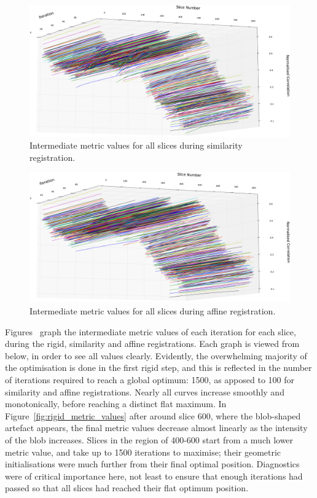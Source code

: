   \begin{figure}
    \centering
    \includegraphics[width=\textheight]{Ch6/Figs/diagnostics/similarity_metric_values}
    \caption{Intermediate metric values for all slices during similarity registration.}
    \label{fig:similarity_metric_values}
  \end{figure}
      
  \begin{figure}
    \centering
    \includegraphics[width=\textheight]{Ch6/Figs/diagnostics/affine_metric_values}
    \caption{Intermediate metric values for all slices during affine registration.}
    \label{fig:affine_metric_values}
  \end{figure}
  
	Figures~ graph the intermediate metric values of each iteration for each slice, during the rigid, similarity and affine registrations. Each graph is viewed from below, in order to see all values clearly. Evidently, the overwhelming majority of the optimisation is done in the first rigid step, and this is reflected in the number of iterations required to reach a global optimum: 1500, as apposed to 100 for similarity and affine registrations. Nearly all curves increase smoothly and monotonically, before reaching a distinct flat maximum. In Figure~\ref{fig:rigid_metric_values} after around slice 600, where the blob-shaped artefact appears, the final metric values decrease almost linearly as the intensity of the blob increases. Slices in the region of 400-600 start from a much lower metric value, and take up to 1500 iterations to maximise; their geometric initialisations were much further from their final optimal position. Diagnostics were of critical importance here, not least to ensure that enough iterations had passed so that all slices had reached their flat optimum position.
	
